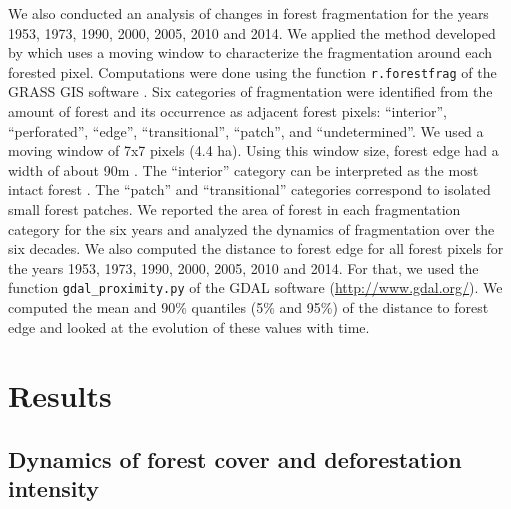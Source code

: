 \documentclass[a4paper, 12pt, leqno]{article} %
\begin{document}
We also conducted an analysis of changes in forest fragmentation for
the years 1953, 1973, 1990, 2000, 2005, 2010 and 2014. We applied the
method developed by \citet{Riitters2000} which uses a moving window to
characterize the fragmentation around each forested
pixel. Computations were done using the function \texttt{r.forestfrag}
of the GRASS GIS software \citep{Neteler2008}. Six categories of
fragmentation were identified from the amount of forest and its
occurrence as adjacent forest pixels: ``interior'', ``perforated'',
``edge'', ``transitional'', ``patch'', and ``undetermined''. We used a
moving window of 7x7 pixels (4.4 ha). Using this window size, forest
edge had a width of about 90m \citep{Riitters2000}. The ``interior''
category can be interpreted as the most intact forest
\citep{Potapov2017}. The ``patch'' and ``transitional'' categories
correspond to isolated small forest patches. We reported the area of
forest in each fragmentation category for the six years and analyzed
the dynamics of fragmentation over the six decades. We also computed
the distance to forest edge for all forest pixels for the years 1953,
1973, 1990, 2000, 2005, 2010 and 2014. For that, we used the function
\texttt{gdal\_proximity.py} of the GDAL software
(\url{http://www.gdal.org/}). We computed the mean and 90\% quantiles
(5\% and 95\%) of the distance to forest edge and looked at the
evolution of these values with time.

\newpage

\section{Results}
\label{results}

\subsection{Dynamics of forest cover and deforestation
intensity}
\end{document}
